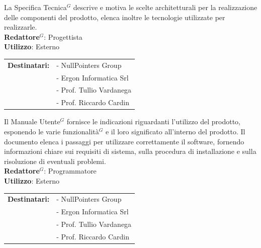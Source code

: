 	La Specifica Tecnica$^G$ descrive e motiva le scelte architetturali per la realizzazione delle componenti del prodotto, elenca inoltre le tecnologie utilizzate per realizzarle.\\[0.5em]
	\medskip
	\textbf{Redattore$^G$}: Progettista\\
	\medskip
	\textbf{Utilizzo}: Esterno\\
	\medskip 
	\begin{tabular}{@{}l l}
		\textbf{Destinatari:} & - NullPointers Group\\
		                      & - Ergon Informatica Srl\\
		                      & - Prof. Tullio Vardanega\\
							  & - Prof. Riccardo Cardin
	\end{tabular}

	Il Manuale Utente$^G$ fornisce le indicazioni riguardanti l'utilizzo del prodotto, esponendo le varie funzionalità$^G$ e il loro significato all'interno del prodotto.
	Il documento elenca i passaggi per utilizzare correttamente il software, fornendo informazioni chiare sui requisiti di sistema, sulla procedura di installazione e sulla 
	risoluzione di eventuali problemi.\\[0.5em] 
	\medskip
	\textbf{Redattore$^G$}: Programmatore\\
	\medskip
	\textbf{Utilizzo}: Esterno\\
	\medskip 
	\begin{tabular}{@{}l l}
		\textbf{Destinatari:} & - NullPointers Group\\
		                      & - Ergon Informatica Srl\\
		                      & - Prof. Tullio Vardanega\\
							  & - Prof. Riccardo Cardin
	\end{tabular}

